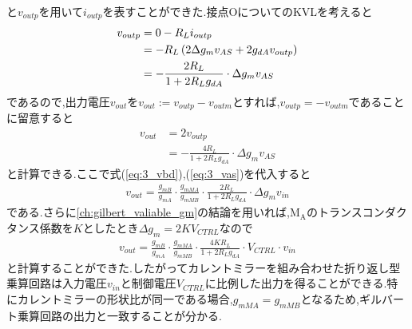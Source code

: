         と$v_{outp}$を用いて$i_{outp}$を表すことができた.接点OについてのKVLを考えると
        \begin{align}
            v_{outp}&=0-R_{L}i_{outp}       \notag\\
            &=-R_{L}\left( 2\Delta g_{m}v_{AS}+2g_{dA}v_{outp}  \right)       \notag\\
            &=-\frac{ 2R_{L} }{ 1+2R_{L}g_{dA} } \cdot \Delta g_{m}v_{AS}       \label{eq:3_voutp}    
        \end{align}
        であるので,出力電圧$v_{out}$を$v_{out}:=v_{outp}-v_{outm}$とすれば,$v_{outp}=-v_{outm}$であることに留意すると
        \begin{align*}
            v_{out}&=2v_{outp}  \\
            &=-\frac{ 4R_{L} }{ 1+2R_{L}g_{dA} } \cdot \Delta g_{m}v_{AS}
        \end{align*}
        と計算できる.ここで式(\ref{eq:3_vbd}),(\ref{eq:3_vas})を代入すると
        \begin{align*}
            v_{out}=\frac{ g_{mB} }{ g_{mA} }\cdot\frac{ g_{mMA} }{ g_{mMB} }\cdot\frac{ 2R_{L} }{ 1+2R_{L} g_{dA}}\cdot\Delta g_{m}v_{in}
        \end{align*}
        である.さらに\ref{ch:gilbert_valiable_gm}の結論を用いれば,$\mathrm{M_{A}}$のトランスコンダクタンス係数を$K$としたとき$\Delta g_{m}=2KV_{CTRL}$なので
        \begin{align}
            v_{out}=\frac{ g_{mB} }{ g_{mA} }\cdot\frac{ g_{mMA} }{ g_{mMB} }\cdot\frac{ 4KR_{L} }{ 1+2R_{L} g_{dA}}\cdot V_{CTRL}\cdot v_{in}      \label{eq:3_vout}
        \end{align}
        と計算することができた.したがってカレントミラーを組み合わせた折り返し型乗算回路は入力電圧$v_{in}$と制御電圧$V_{CTRL}$に比例した出力を得ることができる.特にカレントミラーの形状比が同一である場合,$g_{mMA}=g_{mMB}$となるため,ギルバート乗算回路の出力と一致することが分かる.


